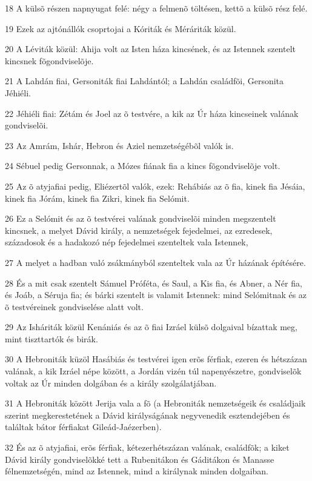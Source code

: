 \par 18 A külsõ részen napnyugat felé: négy a felmenõ töltésen, kettõ a külsõ rész felé.
\par 19 Ezek az ajtónállók csoprtojai a Kóriták és Méráriták közül.
\par 20 A Léviták közül: Ahija volt az Isten háza kincsének, és az Istennek szentelt kincsnek fõgondviselõje.
\par 21 A Lahdán fiai, Gersoniták fiai Lahdántól; a Lahdán családfõi, Gersonita Jéhiéli.
\par 22 Jéhiéli fiai: Zétám és Joel az õ testvére, a kik az Úr háza kincseinek valának gondviselõi.
\par 23 Az Amrám, Ishár, Hebron és Aziel nemzetségébõl valók is.
\par 24 Sébuel pedig Gersonnak, a Mózes fiának fia a kincs fõgondviselõje volt.
\par 25 Az õ atyjafiai pedig, Eliézertõl valók, ezek: Rehábiás az õ fia, kinek fia Jésáia, kinek fia Jórám, kinek fia Zikri, kinek fia Selómit.
\par 26 Ez a Selómit és az õ testvérei valának gondviselõi minden megszentelt kincsnek, a melyet Dávid király, a nemzetségek fejedelmei, az ezredesek, századosok és a hadakozó nép fejedelmei szenteltek vala Istennek,
\par 27 A melyet a hadban való zsákmányból szenteltek vala az Úr házának építésére.
\par 28 És a mit csak szentelt Sámuel Próféta, és Saul, a Kis fia, és Abner, a Nér fia, és Joáb, a Séruja fia; és bárki szentelt is valamit Istennek: mind Selómitnak és az õ testvéreinek gondviselése alatt volt.
\par 29 Az Isháriták közül Kenániás és az õ fiai Izráel külsõ dolgaival bízattak meg, mint tiszttartók és birák.
\par 30 A Hebroniták küzöl Hasábiás és testvérei igen erõs férfiak, ezeren és hétszázan valának, a kik Izráel népe között, a Jordán vizén túl napenyészetre, gondviselõk voltak az Úr minden dolgában és a király szolgálatjában.
\par 31 A Hebroniták között Jerija vala a fõ (a Hebroniták nemzetségeik és családjaik szerint megkerestetének a Dávid királyságának negyvenedik esztendejében és találtak bátor férfiakat Gileád-Jaézerben).
\par 32 És az õ atyjafiai, erõs férfiak, kétezerhétszázan valának, családfõk; a kiket Dávid király gondviselõkké tett a Rubenitákon és Gáditákon és Manasse félnemzetségén, mind az Istennek, mind a királynak minden dolgaiban.

